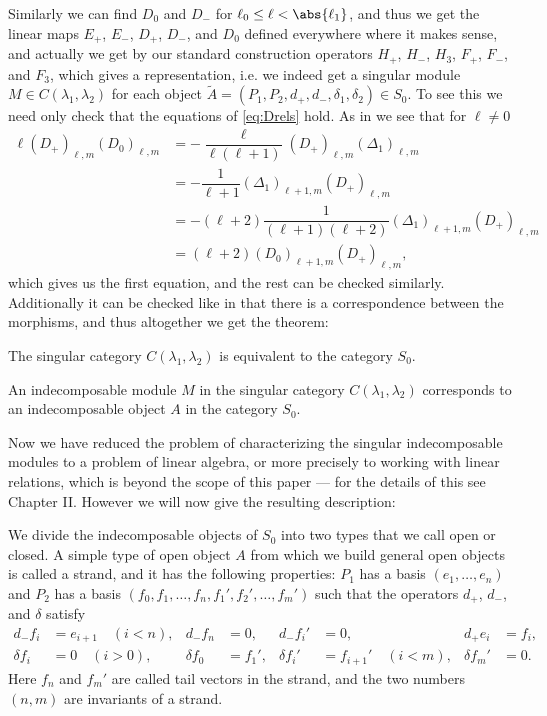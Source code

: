 Similarly we can find $D_0$ and $D_-$ for $\ell_0\leq \ell <\abs{\ell_1}$, and thus we get the linear maps $E_+$, $E_-$, $D_+$, $D_-$, and $D_0$ defined everywhere where it makes sense, and actually we get by our standard construction operators $H_+$, $H_-$, $H_3$, $F_+$, $F_-$, and $F_3$, which gives a representation, i.e. we indeed get a singular module $M\in C(\lambda_1,\lambda_2)$ for each object $\widetilde{A}=(P_1,P_2,d_+,d_-,\delta_1,\delta_2)\in S_0$. To see this we need only check that the equations of \cref{eq:Drels} hold. As in  we see that for $\ell\neq 0$
\begin{align*}
  \ell(D_+)_{\ell,m}(D_0)_{\ell,m} &= -\dfrac{\ell}{\ell(\ell+1)} (D_+)_{\ell,m}(\Delta_1)_{\ell,m} \\
                          &= - \dfrac{1}{\ell+1} (\Delta_1)_{\ell+1,m} (D_+)_{\ell,m} \\
                          &= - (\ell+2)\dfrac{1}{(\ell+1)(\ell+2)} (\Delta_1)_{\ell+1,m} (D_+)_{\ell,m} \\
                          &= (\ell+2)(D_0)_{\ell+1,m}(D_+)_{\ell,m},
\end{align*}
which gives us the first equation, and the rest can be checked similarly. Additionally it can be checked like in  that there is a correspondence between the morphisms, and thus altogether we get the theorem:
\begin{theorem}
  The singular category $C(\lambda_1,\lambda_2)$ is equivalent to the category $S_0$. 
\end{theorem}

\begin{corollary}\label{cor:singindec}
  An indecomposable module $M$ in the singular category $C(\lambda_1,\lambda_2)$ corresponds to an indecomposable object $A$ in the category $S_0$.
\end{corollary}

Now we have reduced the problem of characterizing the singular indecomposable modules to a problem of linear algebra, or more precisely to working with linear relations, which is beyond the scope of this paper --- for the details of this see \cite{indecompReprOfLorGr} Chapter II. However we will now give the resulting description:

We divide the indecomposable objects of $S_0$ into two types that we call open or closed. A simple type of open object $A$ from which we build general open objects is called a strand, and it has the following properties: $P_1$ has a basis $(e_1,\dotsc,e_n)$ and $P_2$ has a basis $(f_0,f_1,\dotsc,f_n,f_1',f_2',\dotsc,f_m')$ such that the operators $d_+$, $d_-$, and $\delta$ satisfy
\begin{align*}
  d_-f_i &= e_{i+1} \quad (i<n), & d_-f_n &= 0, & d_-f_i' &= 0, & d_+e_i &= f_i, \\
  \delta f_i &= 0 \quad (i>0), & \delta f_0 &= f_1', & \delta f_i' &= f_{i+1}' \quad (i<m), & \delta f_m' &= 0.
\end{align*}
Here $f_n$ and $f_m'$ are called tail vectors in the strand, and the two numbers $(n,m)$ are invariants of a strand.

